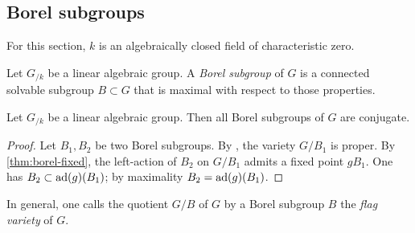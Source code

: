 \subsection{Borel subgroups}

For this section, $k$ is an algebraically closed field of characteristic 
zero. 

\begin{definition}
Let $G_{/k}$ be a linear algebraic group. A \emph{Borel subgroup} of $G$ is 
a connected solvable subgroup $B\subset G$ that is maximal with respect to 
those properties. 
\end{definition}

\begin{theorem}\label{thm:borel-conjugate}
Let $G_{/k}$ be a linear algebraic group. Then all Borel subgroups of $G$ 
are conjugate. 
\end{theorem}
\begin{proof}
Let $B_1,B_2$ be two Borel subgroups. By \cite[18.11.a]{milne-iAG}, the 
variety $G/B_1$ is proper. By \autoref{thm:borel-fixed}, the left-action 
of $B_2$ on $G/B_1$ admits a fixed point $g B_1$. One has 
$B_2\subset\operatorname{ad}(g)(B_1)$; by maximality $B_2=\operatorname{ad}(g)(B_1)$. 
\end{proof}

In general, one calls the quotient $G/B$ of $G$ by a Borel subgroup $B$ the 
\emph{flag variety} of $G$. 

